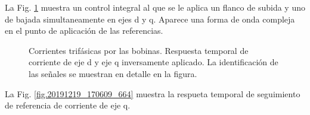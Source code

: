 \documentclass{report}
\begin{document}
La Fig. \ref{fig.20191219_140550_173} muestra un control integral al que se le aplica un flanco de subida y uno de bajada simultaneamente en ejes d y q. Aparece una forma de onda compleja en el punto de aplicación de las referencias.
 
\begin{figure}[!h]
    \begin{center}
    \resizebox{10cm}{!}{\texttt{[image: 20191219\_140550\_173]}}
    \caption{Corrientes trifásicas por las bobinas. Respuesta temporal de corriente de eje d y eje q inversamente aplicado. La identificación de las señales se muestran en detalle en la figura.}
    \label{fig.20191219_140550_173} 
    \end{center}
\end{figure}
\begin{comment}

\begin{table}[!h]
    \begin{minipage}{\textwidth}
    \begin{center}
    \begin{tabular}{|c|c|c|c|c|c|} \hline\hline\hline
    Canal & Color & Elemento & Amplitud (V) & Nº Espiras & Amperaje (A) \\ \hline
    1 & Amarillo & $I_{a}$ & 4.61 & 1 & 4.61 \\ \hline
    2 & Verde & $I_{b}$ & 4.42 & 1 & 4.42 \\ \hline   
    3 & Rosa & $I_{c}$ & 4.57 & 1 &  4.57\\ \hline
    4 \footnote{Medidas no disponibles}& Azul Claro  & $I_{d}$ & - & - & - \\ \hline
    5 \footnote{Medidas no disponibles}  & Rojo & $I_{d}^{ref}$ & - & - & - \\ \hline
    6 \footnote{Medidas no disponibles}& Naranja & $I_{q}$ & - & - &  -\\ \hline
    9 \footnote{Medidas no disponibles}& Azul Oscuro & $I_{q}^{ref}$ & - & - & - \\ \hline


    \end{tabular}
    \end{center}
    \caption{Tabla con los datos de la Fig. \ref{fig.20191219_140550_173}) con las corrientes trifásicas.} \label{tab.20191219_140550_173}
\end{minipage}
\end{table}
\end{comment}


La Fig. \ref{fig.20191219_170609_664} muestra la respueta temporal de seguimiento de referencia de corriente de eje q.
 
\end{document}
